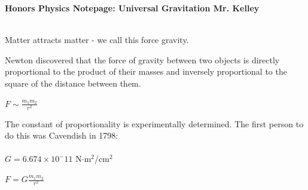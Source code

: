 \documentclass[12pt]{report}
\begin{document}
{\bf{Honors Physics} \hfill Notepage: Universal Gravitation \hfill {Mr. Kelley}} \\ \\

\vspace{1cm}

\hfill \parbox{6cm}{\centering Matter attracts matter - we call this force gravity.} \hfill {} \hfill
\vspace{1cm}
\parbox{10cm}{Newton discovered that the force of gravity between two objects is directly proportional to the product of their masses and inversely proportional to the square of the distance between them.} \hfill \mbox{\large $F \sim \frac{m_1 m_2}{r^2}$} \hfill
\vspace{1cm}

\hspace{3cm} \parbox{8cm}{The constant of proportionality is experimentally determined.  The first person to do this was Cavendish in 1798: \\ \\ $G = 6.674 \times 10^-{11}$ N$\cdot$m$^2$/cm$^2$} \hfill \mbox{\Large $F = G \frac{m_1 m_2}{r^2}$} \hfill
\vspace{1.5cm}
\end{document}
